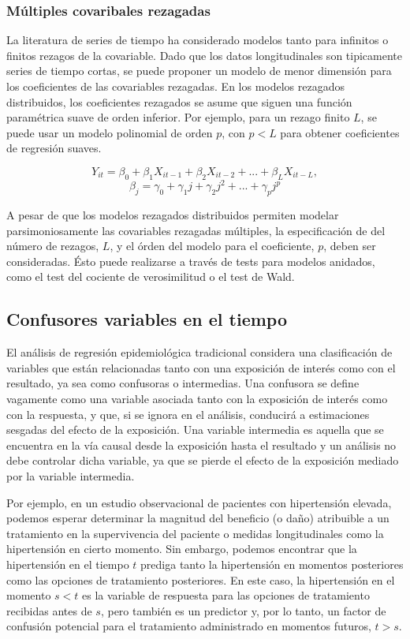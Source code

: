 \documentclass[spanish]{article}
\numberwithin{figure}{subsection}
\numberwithin{equation}{subsection}
\numberwithin{table}{subsection}
\begin{document}
\subsubsection{Múltiples covaribales rezagadas}

La literatura de series de tiempo ha considerado modelos tanto para infinitos o
finitos rezagos de la covariable. Dado que los datos longitudinales son
tipicamente series de tiempo cortas, se puede proponer un modelo de menor
dimensión para los coeficientes de las covariables rezagadas. En los modelos
rezagados distribuidos, los coeficientes rezagados se asume que siguen una
función paramétrica suave de orden inferior. Por ejemplo, para un rezago finito
$L$, se puede usar un modelo polinomial de orden $p$, con $p < L$ para obtener
coeficientes de regresión suaves.

\[ Y_{it} = \beta_0 + \beta_1 X_{it-1} + \beta_2 X_{it-2} + ... +
\beta_L X_{it-L}, \]
\[ \beta_j = \gamma_0 + \gamma_1 j + \gamma_2 j^2 + ... + \gamma_p j^p \]

A pesar de que los modelos rezagados distribuidos permiten modelar
parsimoniosamente las covariables rezagadas múltiples, la especificación de del
número de rezagos, $L$, y el órden del modelo para el coeficiente, $p$, deben
ser consideradas. Ésto puede realizarse a través de tests para modelos
anidados, como el test del cociente de verosimilitud o el test de Wald.

\subsection{Confusores variables en el tiempo}

El análisis de regresión epidemiológica tradicional considera una clasificación
de variables que están relacionadas tanto con una exposición de interés como
con el resultado, ya sea como confusoras o intermedias. Una confusora se define
vagamente como una variable asociada tanto con la exposición de interés como
con la respuesta, y que, si se ignora en el análisis, conducirá a estimaciones
sesgadas del efecto de la exposición. Una variable intermedia es aquella que se
encuentra en la vía causal desde la exposición hasta el resultado y un análisis
no debe controlar dicha variable, ya que se pierde el efecto de la exposición
mediado por la variable intermedia.

Por ejemplo, en un estudio observacional de pacientes con hipertensión elevada,
podemos esperar determinar la magnitud del beneficio (o daño) atribuible a un
tratamiento en la supervivencia del paciente o medidas longitudinales como la
hipertensión en cierto momento. Sin embargo, podemos encontrar que la
hipertensión en el tiempo $t$ prediga tanto la hipertensión en momentos
posteriores como las opciones de tratamiento posteriores. En este caso, la
hipertensión en el momento $s < t$ es la variable de respuesta para las
opciones de tratamiento recibidas antes de $s$, pero también es un predictor y,
por lo tanto, un factor de confusión potencial para el tratamiento administrado
en momentos futuros, $t > s$.
\end{document}
